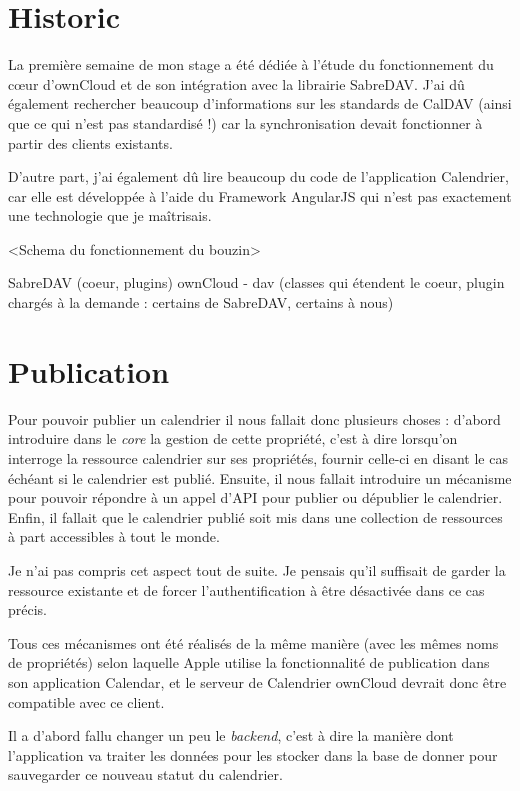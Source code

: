 \documentclass[10pt,a4paper]{report}
\begin{document}
	\section{Historic}
	La première semaine de mon stage a été dédiée à l'étude du fonctionnement du cœur d'ownCloud et de son intégration avec la librairie SabreDAV. J'ai dû également rechercher beaucoup d'informations sur les standards de CalDAV (ainsi que ce qui n'est pas standardisé !) car la synchronisation devait fonctionner à partir des clients existants.
	
	D'autre part, j'ai également dû lire beaucoup du code de l'application Calendrier, car elle est développée à l'aide du Framework AngularJS qui n'est pas exactement une technologie que je maîtrisais.
	
	<Schema du fonctionnement du bouzin>
	
	SabreDAV (coeur, plugins)
	ownCloud - dav (classes qui étendent le coeur, plugin chargés à la demande : certains de SabreDAV, certains à nous)
	
	\section{Publication}
	Pour pouvoir publier un calendrier il nous fallait donc plusieurs choses : d'abord introduire dans le \textit{core} la gestion de cette propriété, c'est à dire lorsqu'on interroge la ressource calendrier sur ses propriétés, fournir celle-ci en disant le cas échéant si le calendrier est publié.
	Ensuite, il nous fallait introduire un mécanisme pour pouvoir répondre à un appel d'API pour publier ou dépublier le calendrier. Enfin, il fallait que le calendrier publié soit mis dans une collection de ressources à part accessibles à tout le monde.
	
	Je n'ai pas compris cet aspect tout de suite. Je pensais qu'il suffisait de garder la ressource existante et de forcer l'authentification à être désactivée dans ce cas précis.
	
	Tous ces mécanismes ont été réalisés de la même manière (avec les mêmes noms de propriétés) selon laquelle Apple utilise la fonctionnalité de publication dans son application Calendar, et le serveur de Calendrier ownCloud devrait donc être compatible avec ce client.
	
	Il a d'abord fallu changer un peu le \textit{backend}, c'est à dire la manière dont l'application va traiter les données pour les stocker dans la base de donner pour sauvegarder ce nouveau statut du calendrier.
	
\end{document}
